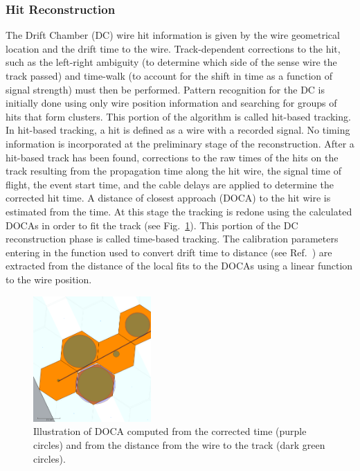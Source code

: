\subsubsection{Hit Reconstruction}
\label{sec:hitrecon}

The Drift Chamber (DC) wire hit information is given by the wire geometrical location and the drift time to the
wire. Track-dependent corrections to the hit, such as the left-right ambiguity (to determine which side of the
sense wire the track passed) and time-walk (to account for the shift in time as a function of signal strength)
must then be performed. Pattern recognition for the DC is initially done using only wire position information and
searching for groups of hits that form clusters. This portion of the algorithm is called hit-based tracking.  In
hit-based tracking, a hit is defined as a wire with a recorded signal. No timing information is incorporated at the
preliminary stage of the reconstruction. After a hit-based track has been found, corrections to the raw times of
the hits on the track resulting from the propagation time along the hit wire, the signal time of flight, the event start
time, and the cable delays are applied to determine the corrected hit time. A distance of closest approach (DOCA)
to the hit wire is estimated from the time. At this stage the tracking is redone using the calculated DOCAs in order
to fit the track (see Fig.~\ref{fig:docas}). This portion of the DC reconstruction phase is called time-based tracking.
The calibration parameters entering in the function used to convert drift time to distance (see Ref.~\cite{dc-nim})
are extracted from the distance of the local fits to the DOCAs using a linear function to the wire position. 

\begin{figure}
\centering
\includegraphics[width=0.4\textwidth]{pics/dcPattern10.png}
\caption{Illustration of DOCA computed from the corrected time (purple circles) and from the distance from the
  wire to the track (dark green circles).}
\label{fig:docas}
\end{figure}

